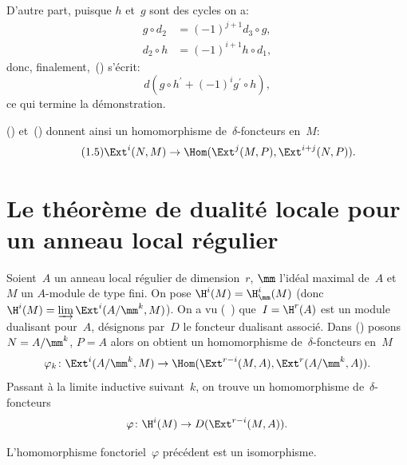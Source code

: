 D'autre part\pageoriginale, puisque $h$ et~$g$ sont des cycles on a:
\begin{align*}
g\circ d_{2} &= (-1)^{j+1}d_{3}\circ g, \\
d_{2}\circ h &= (-1)^{i+1}h\circ d_{1},
\end{align*}
donc, finalement,~() s'\'ecrit:
$$d(g\circ h^{\prime}+(-1)^{i}g^{\prime}\circ h),
$$
ce qui termine la d\'emonstration.

() et~() donnent ainsi un homomorphisme de~$\delta$-foncteurs en~$M$:
\begin{equation*} \label{eq:V.1.5} \tag{1.5} \Ext^{i}(N, M)\to\Hom(\Ext^{j}(M, P), \Ext^{i+j}(N, P)).
\end{equation*}

\section{Le th\'eor\`eme de dualit\'e locale pour un anneau local r\'egulier} \label{V.2}

\setcounter{equation}{12}

Soient~$A$ un anneau local r\'egulier de dimension~$r$, $\mm$ l'id\'eal maximal de~$A$ et~$M$ un $A$-module de type fini. \label{pV2.4}On pose $\H^{i}(M)=\H^{i}_{\mm}(M)$ (donc $\H^{i}(M)=\varinjlim\Ext^{i}(A/\mm^{k}, M)$). On a vu (~) que~$I=\H^{r}(A)$ est un module dualisant pour~$A$, d\'esignons par~$D$ le foncteur dualisant associ\'e. Dans () posons $N=A/\mm^{k}$, $P=A$ alors on obtient un homomorphisme de~$\delta$-foncteurs en~$M$
\begin{equation} \label{eq:V.13} \varphi_{k}\colon\Ext^{i}(A/\mm^{k}, M)\to\Hom(\Ext^{r-i}(M, A), \Ext^{r}(A/\mm^{k}, A)).
\end{equation}
Passant \`a la limite inductive suivant~$k$, on trouve un homomorphisme de~$\delta$-foncteurs
\begin{equation} \label{eq:V.14} \varphi\colon\H^{i}(M)\to D(\Ext^{r-i}(M, A)).
\end{equation}

\begin{theoreme} \label{V.2.1}
L'homomorphisme fonctoriel~$\varphi$ pr\'ec\'edent est un isomorphisme.
\end{theoreme}

